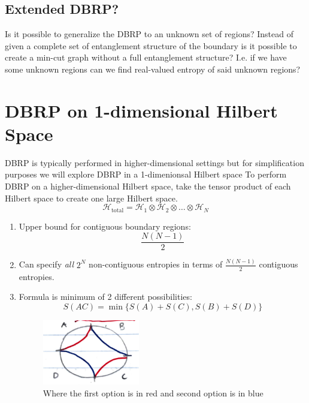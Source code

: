 \documentclass[12pt]{article}
\begin{document}
\subsection{Extended DBRP?}
\hspace{0.5cm} Is it possible to generalize the DBRP to an unknown set of regions? Instead of given a complete set of entanglement structure of the boundary is it possible to create a min-cut graph without a full entanglement structure? I.e. if we have some unknown regions can we find real-valued entropy of said unknown regions?

\section{DBRP on 1-dimensional Hilbert Space}
DBRP is typically performed in higher-dimensional settings but for simplification purposes we will explore DBRP in a 1-dimenionsal Hilbert space
To perform DBRP on a higher-dimensional Hilbert space, take the tensor product of each Hilbert space to create one large Hilbert space.
    \[
    \mathcal{H}_{\text{total}} = \mathcal{H}_1 \otimes \mathcal{H}_2 \otimes \dots \otimes \mathcal{H}_N
    \]
\begin{enumerate}
    \item Upper bound for contiguous boundary regions: 
    \[
    \frac{N(N-1)}{2}
    \]
    \item Can specify \textit{all} \( 2^N \) non-contiguous entropies in terms of \( \frac{N(N-1)}{2} \) contiguous entropies.
    \item Formula is minimum of 2 different possibilities:
    \[
    S(AC) = \min\{ S(A) + S(C), S(B) + S(D) \}
    \]
    \begin{figure}[htbp]  %
        \centering
        \includegraphics[width=0.4\textwidth, height=0.2\textheight]{parts.pdf}  %
        \caption{Where the first option is in red and second option is in blue}  %
        \label{fig:example}  %
    \end{figure}
\end{enumerate}
\end{document}
